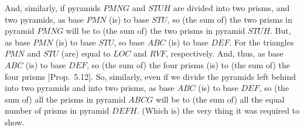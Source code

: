 \begin{Parallel}{}{}
{And, similarly, if pyramids $PMNG$ and $STUH$ are divided into two prisms, and
two pyramids, as base $PMN$ (is) to base $STU$, so (the sum of) the  two prisms in pyramid
$PMNG$ will be to (the sum of) the  two prisms in pyramid $STUH$. But, as base $PMN$ (is) to
base $STU$, so base $ABC$ (is) to base $DEF$. For  the triangles $PMN$ and
$STU$ (are) equal to $LOC$ and $RVF$, respectively. And, thus, as base $ABC$ (is)
to base $DEF$, so (the sum of) the four prisms (is) to (the sum of) the four prisms [Prop.~5.12].
So, similarly, even if we  divide the pyramids left behind into two pyramids
and into two prisms, as base $ABC$ (is) to base $DEF$, so (the sum of) all the prisms in pyramid
$ABCG$ will be to (the sum of) all the equal number of prisms in pyramid $DEFH$. (Which is) the
very thing it was required to show.}
\end{Parallel}

